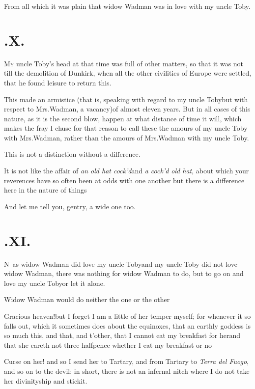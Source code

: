 \documentclass{article}
\begin{document}
From all which it was plain that widow Wadman was in love
with my uncle Toby.

\section{.\enspace X.}

\lettrine{M}{y} uncle Toby’s head at
that time was full of other matters,\break
so that it was not till the
demolition of Dunkirk, when all the other civilities of
Europe were settled, that he found leisure to return
this.

This made an armistice (that is, speaking with regard to my uncle Toby\tsk but with
respect to Mrs.\@ Wadman, a vacancy)\tsk of almost eleven years. But in all cases of
this nature, as it is the second blow, happen at what distance of time it will,
which makes the fray\tsh\break 
I chuse for that reason to call these\break 
the amours of my uncle Toby with\break
Mrs.\@ Wadman, rather than the amours\break
of Mrs.\@ Wadman with my uncle Toby.

This is not a distinction without a difference.

It is not like the affair of \textit{an old hat cock’d}\tsk and
\textit{a cock’d
old hat}, about which your reverences have so often been at odds with one another
\tsh but there is a difference here in the nature of\break
things\tsh

And let me tell you, gentry, a wide one too.

\vfill{}\eject
\section{.\enspace XI.}

\lettrine{N}{\,} as widow Wadman did love
my uncle Toby\tsh and my uncle Toby did not
love widow Wadman, there was nothing for widow Wadman
to do, but to go on and love my uncle Toby\tsh or
let it alone.

Widow Wadman would do neither the one or the other\tsk

\tsk Gracious heaven!\tsk but I forget I am a
little of her temper myself; for whenever it so falls out, which it
sometimes does about the equinoxes, that an earthly goddess is so
much this, and that, and t’other, that I cannot eat my
breakfast for her\tsh and that she careth not three
halfpence whether I eat my breakfast or no\tsh

\tsh Curse on her! and so I send her to Tartary,
and from Tartary to \textit{Terra del Fuogo}, and so on to the
devil: in short, there is not an infernal nitch where I do not take
her divinityship and stick\break it.
\end{document}
